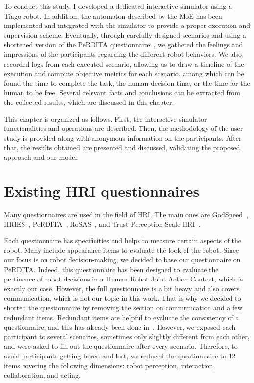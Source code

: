 To conduct this study, I developed a dedicated interactive simulator using a Tiago robot. In addition, the automaton described by the MoE has been implemented and integrated with the simulator to provide a proper execution and supervision scheme. Eventually, through carefully designed scenarios and using a shortened version of the PeRDITA questionnaire~\cite{devin_evaluating_2018}, we gathered the feelings and impressions of the participants regarding the different robot behaviors. We also recorded logs from each executed scenario, allowing us to draw a timeline of the execution and compute objective metrics for each scenario, among which can be found the time to complete the task, the human decision time, or the time for the human to be free. Several relevant facts and conclusions can be extracted from the collected results, which are discussed in this chapter.

This chapter is organized as follows. First, the interactive simulator functionalities and operations are described. Then, the methodology of the user study is provided along with anonymous information on the participants. After that, the results obtained are presented and discussed, validating the proposed approach and our model.

\section{Existing HRI questionnaires}

Many questionnaires are used in the field of HRI. The main ones are GodSpeed~\cite{bartneck_measurement_2009}, HRIES~\cite{spatola_perception_2021}, PeRDITA~\cite{devin_evaluating_2018}, RoSAS~\cite{carpinella_robotic_2017}, and Trust Perception Scale-HRI~\cite{mittu_measuring_2016}. 

Each questionnaire has specificities and helps to measure certain aspects of the robot. Many include appearance items to evaluate the look of the robot. Since our focus is on robot decision-making, we decided to base our questionnaire on PeRDITA. Indeed, this questionnaire has been designed to evaluate the pertinence of robot decisions in a Human-Robot Joint Action Context, which is exactly our case. However, the full questionnaire is a bit heavy and also covers communication, which is not our topic in this work. 
That is why we decided to shorten the questionnaire by removing the section on communication and a few redundant items. Redundant items are helpful to evaluate the consistency of a questionnaire, and this has already been done in~\cite{devin_evaluating_2018}. 
However, we exposed each participant to several scenarios, sometimes only slightly different from each other, and were asked to fill out the questionnaire after every scenario. Therefore, to avoid participants getting bored and lost, we reduced the questionnaire to 12 items covering the following dimensions: robot perception, interaction, collaboration, and acting.


